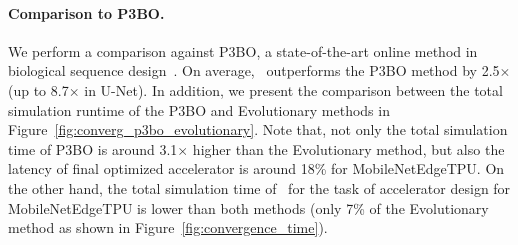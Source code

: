 \paragraph{Comparison to P3BO.}
%
We perform a comparison against P3BO, a state-of-the-art online method in biological sequence design~\citep{p3bo:arxiv:2020}.
%
On average, \primemethodname\ outperforms the P3BO method by 2.5$\times$ (up to 8.7$\times$ in U-Net).
%
In addition, we present the comparison between the total simulation runtime of the P3BO and Evolutionary methods in Figure~\ref{fig:converg_p3bo_evolutionary}.
%
Note that, not only the total simulation time of P3BO is around 3.1$\times$ higher than the Evolutionary method, but also the latency of final optimized accelerator is around 18\% for MobileNetEdgeTPU.
%
On the other hand, the total simulation time of \primemethodname\ for the task of accelerator design for MobileNetEdgeTPU is lower than both methods (only 7\% of the Evolutionary method as shown in Figure~\ref{fig:convergence_time}).
%
\begin{table}[H]
\small
\centering
\vspace*{0.1cm}
\caption{Optimized objective values (i.e., latency in milliseconds) obtained by \primemethodname\ and P3BO~\citep{p3bo:arxiv:2020} when optimizing over single applications (MobileNetEdgeTPU, \mfour, t-RNN Dec, t-RNN Enc, and U-Net). On average, \primemethodname\ outperforms P3BO by 2.5$\times$.}
\label{table:p3bo_vs_prime}
\vspace{-0.1cm}
\end{table}
%
